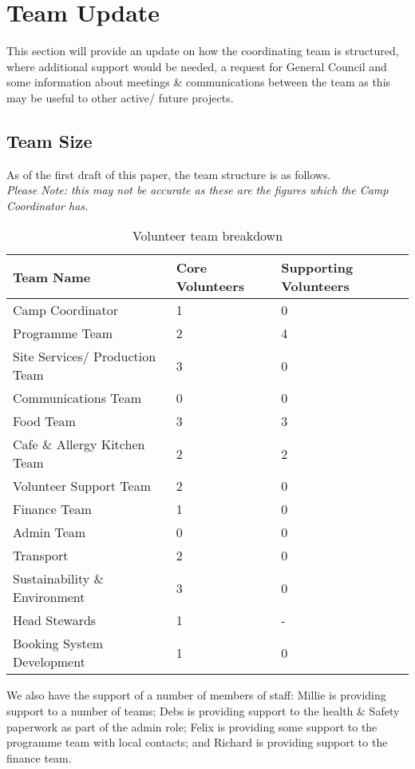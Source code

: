 \chapter{Team Update}
This section will provide an update on how the coordinating team is structured, where additional support would be needed, a request for General Council and some information about meetings \& communications between the team as this may be useful to other active/ future projects.
\section{Team Size}
As of the first draft of this paper, the team structure is as follows.\\
\textit{Please Note: this may not be accurate as these are the figures which the Camp Coordinator has.}
\begin{table}[H]
    \begin{tabularx}{\textwidth}{lXX}
        \textbf{Team Name} & \textbf{Core Volunteers} & \textbf{Supporting Volunteers} \\
        \hline
        \hline
        Camp Coordinator & 1 & 0\\
        \hline
        Programme Team & 2 & 4\\
        \hline
        Site Services/ Production Team & 3 & 0\\
        \hline
        Communications Team & 0 & 0\\
        \hline
        Food Team & 3 & 3 \\
        \hline
        Cafe \& Allergy Kitchen Team & 2 & 2 \\
        \hline
        Volunteer Support Team & 2 & 0\\
        \hline
        Finance Team & 1 & 0\\
        \hline
        Admin Team & 0 & 0\\
        \hline
        Transport & 2 & 0\\
        \hline
        Sustainability \& Environment & 3 & 0\\
        \hline
        Head Stewards & 1 & -\\
        \hline
        Booking System Development & 1 & 0\\
        \hline
    \end{tabularx}
    \caption{Volunteer team breakdown}
\end{table}

We also have the support of a number of members of staff: Millie is providing support to a number of teams; Debs is providing support to the health \& Safety paperwork as part of the admin role; Felix is providing some support to the programme team with local contacts; and Richard is providing support to the finance team.

